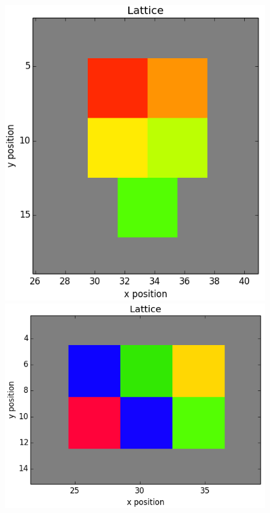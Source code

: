 \documentclass[12pt]{article}
\begin{document}
\begin{figure}[H]
	\includegraphics[scale=0.20]{img/5ctc_start}
	\includegraphics[scale=0.20]{img/6ctc_start}

\end{figure}
\end{document}

